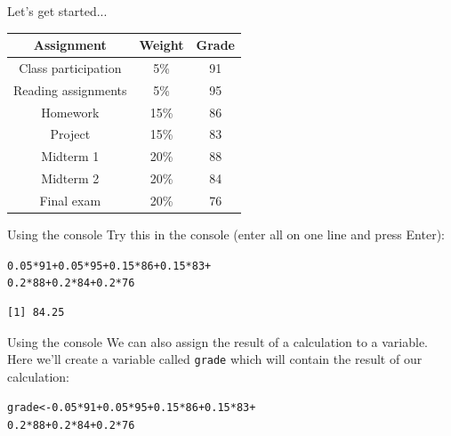 \documentclass{beamer}\usepackage[]{graphicx}\usepackage[]{color}
\makeatletter
\newcommand{\hlnum}[1]{\textcolor[rgb]{0.824,0.412,0.118}{#1}}%
\newcommand{\hlopt}[1]{\textcolor[rgb]{1,0.894,0.769}{#1}}%
\newcommand{\hlstd}[1]{\textcolor[rgb]{1,0.894,0.769}{#1}}%
\newcommand{\hlkwb}[1]{\textcolor[rgb]{0.804,0.776,0.451}{#1}}%
\newenvironment{kframe}{%
 \def\at@end@of@kframe{}%
 \ifinner\ifhmode%
  \def\at@end@of@kframe{\end{minipage}}%
  \begin{minipage}{\columnwidth}%
 \fi\fi%
 \def\FrameCommand##1{\hskip\@totalleftmargin \hskip-\fboxsep
 \colorbox{shadecolor}{##1}\hskip-\fboxsep
     \hskip-\linewidth \hskip-\@totalleftmargin \hskip\columnwidth}%
 \MakeFramed {\advance\hsize-\width
   \@totalleftmargin\z@ \linewidth\hsize
   \@setminipage}}%
 {\par\unskip\endMakeFramed%
 \at@end@of@kframe}
\newenvironment{knitrout}{}{} %
\makeatother
\begin{document}
\begin{darkframes}
\begin{frame}{Let's get started...}
    \begin{table}[!b]
      \begin{tabular}{ccc}
         Assignment & Weight  & Grade \\
        \toprule
          Class participation & 5\%	&	91  \\
          Reading assignments & 5\%	&	95  \\
          Homework    & 15\%	&	 86 \\
          Project     & 15\%	&	 83 \\
          Midterm 1   & 20\%	&	 88 \\
          Midterm 2   & 20\%	&	 84 \\
          Final exam  & 20\%	&	 76 \\
      \end{tabular}
    \end{table}
    \end{frame}


    \begin{frame}[fragile]{Using the console}
      Try this in the console (enter all on one line and press Enter):
\begin{knitrout}
\begin{kframe}
\begin{alltt}
\hlnum{0.05}\hlopt{*}\hlnum{91} \hlopt{+} \hlnum{0.05}\hlopt{*}\hlnum{95} \hlopt{+} \hlnum{0.15}\hlopt{*}\hlnum{86} \hlopt{+} \hlnum{0.15}\hlopt{*}\hlnum{83} \hlopt{+}
  \hlnum{0.2}\hlopt{*}\hlnum{88} \hlopt{+} \hlnum{0.2}\hlopt{*}\hlnum{84} \hlopt{+} \hlnum{0.2}\hlopt{*}\hlnum{76}
\end{alltt}
\begin{verbatim}
[1] 84.25
\end{verbatim}
\end{kframe}
\end{knitrout}
    \end{frame}

    \begin{frame}[fragile]{Using the console}
      We can also assign the result of a calculation to a variable.
      Here we'll create a variable called \verb|grade| which will contain
      the result of our calculation:

\begin{knitrout}
\begin{kframe}
\begin{alltt}
\hlstd{grade} \hlkwb{<-} \hlnum{0.05}\hlopt{*}\hlnum{91} \hlopt{+} \hlnum{0.05}\hlopt{*}\hlnum{95} \hlopt{+} \hlnum{0.15}\hlopt{*}\hlnum{86} \hlopt{+} \hlnum{0.15}\hlopt{*}\hlnum{83} \hlopt{+}
  \hlnum{0.2}\hlopt{*}\hlnum{88} \hlopt{+} \hlnum{0.2}\hlopt{*}\hlnum{84} \hlopt{+} \hlnum{0.2}\hlopt{*}\hlnum{76}
\end{alltt}
\end{kframe}
\end{knitrout}


\end{frame}
\end{darkframes}
\end{document}
